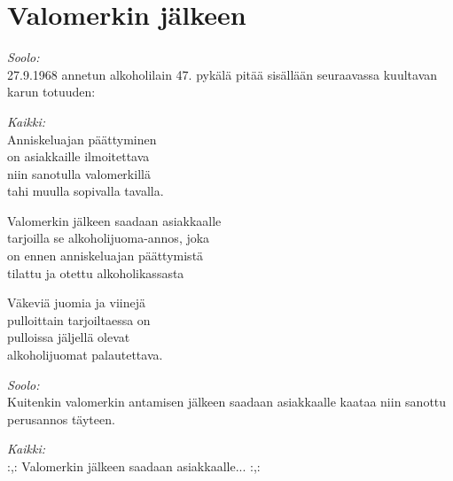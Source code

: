 \section{Valomerkin jälkeen}
\vspace*{-0.55cm}
\textit{Soolo:}\\
27.9.1968 annetun alkoholilain 47. pykälä pitää sisällään seuraavassa kuultavan karun totuuden:

\textit{Kaikki:}\\
Anniskeluajan päättyminen\\
on asiakkaille ilmoitettava\\
niin sanotulla valomerkillä\\
tahi muulla sopivalla tavalla.

Valomerkin jälkeen saadaan asiakkaalle\\
tarjoilla se alkoholijuoma-annos, joka\\
on ennen anniskeluajan päättymistä\\
tilattu ja otettu alkoholikassasta

Väkeviä juomia ja viinejä\\
pulloittain tarjoiltaessa on\\
pulloissa jäljellä olevat\\
alkoholijuomat palautettava.

\textit{Soolo:}\\
Kuitenkin valomerkin antamisen jälkeen saadaan asiakkaalle
kaataa niin sanottu perusannos täyteen.

\textit{Kaikki:}\\
:,: Valomerkin jälkeen saadaan asiakkaalle... :,: